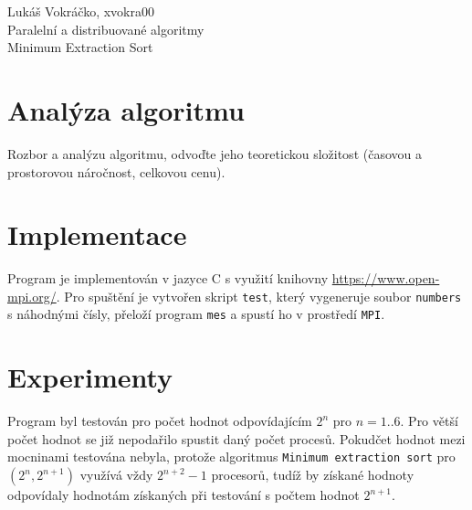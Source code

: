 \documentclass[12pt,a4paper,titlepage,final]{article}
\begin{document}
\newpage

\def\name{Lukáš Vokráčko}
\def\login{xvokra00}
\def\subject{Paralelní a distribuované algoritmy}
\def\project{Minimum Extraction Sort}


{
	\pagestyle{empty}
	
	\tableofcontents
	\newpage
	\pagestyle{plain}
}
{
	\pagestyle{plain}
	\hfill \name, \login \\
	\vspace*{5px}
	{\LARGE \subject}  \\
	{\LARGE \project}  \\
}

\setcounter{page}{1}

\section{Analýza algoritmu}
Rozbor a analýzu algoritmu, odvoďte jeho teoretickou složitost (časovou a prostorovou náročnost, celkovou cenu).

\section{Implementace}
Program je implementován v jazyce C s využití knihovny \url{https://www.open-mpi.org/}.
Pro spuštění je vytvořen skript \texttt{test}, který vygeneruje soubor \texttt{numbers} s náhodnými čísly,
přeloží program \texttt{mes} a spustí ho v prostředí \texttt{MPI}.

\section{Experimenty}
Program byl testován pro počet hodnot odpovídajícím $2^n$ pro $n = 1 .. 6$. Pro větší počet hodnot se již nepodařilo spustit daný počet procesů.
Pokudčet hodnot mezi mocninami testována nebyla, protože algoritmus \texttt{Minimum extraction sort} pro $(2^n,2^{n+1})$ využívá vždy $2^{n+2}-1$ procesorů,
tudíž by získané hodnoty odpovídaly hodnotám získaných při testování s počtem hodnot $2^{n+1}$.
\end{document}
